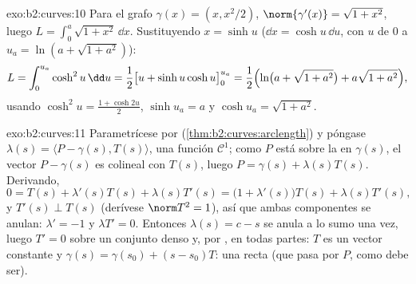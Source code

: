 \begin{solution}{exo:b2:curves:10}
Para el grafo $\gamma(x) = (x, x^2/2)$, $\norm{\gamma'(x)} = \sqrt{1
+ x^2}$, luego $L = \int_0^a\sqrt{1+x^2}\,\dd x$. Sustituyendo $x =
\sinh u$ ($\dd x = \cosh u\,\dd u$, con $u$ de $0$ a $u_a = \ln(a +
\sqrt{1+a^2})$):
\[
L = \int_0^{u_a}\cosh^2 u\,\dd u
= \frac12\bigl[u + \sinh u\cosh u\bigr]_0^{u_a}
= \frac12\Bigl(\ln\bigl(a + \sqrt{1+a^2}\bigr) +
a\sqrt{1+a^2}\Bigr),
\]
usando $\cosh^2 u = \frac{1 + \cosh 2u}2$, $\sinh u_a = a$ y $\cosh
u_a = \sqrt{1 + a^2}$.
\end{solution}

\begin{solution}{exo:b2:curves:11}
Parametrícese por 
(\cref{thm:b2:curves:arclength}) y póngase $\lambda(s) = \langle P -
\gamma(s), T(s)\rangle$, una función $\mathcal C^1$; como $P$ está
sobre la  en $\gamma(s)$, el vector $P - \gamma(s)$ es
colineal con $T(s)$, luego $P = \gamma(s) + \lambda(s)T(s)$.
Derivando,
\[
0 = T(s) + \lambda'(s)T(s) + \lambda(s)T'(s)
= \bigl(1 + \lambda'(s)\bigr)T(s) + \lambda(s)T'(s),
\]
y $T'(s) \perp T(s)$ (derívese $\norm T^2 = 1$), así que ambas
componentes se anulan: $\lambda' = -1$ y $\lambda T' = 0$. Entonces
$\lambda(s) = c - s$ se anula a lo sumo una vez, luego $T' = 0$ sobre
un conjunto denso y, por , en todas partes: $T$ es un
vector  constante y $\gamma(s) = \gamma(s_0) + (s - s_0)T$:
una recta (que pasa por $P$, como debe ser).
\end{solution}

